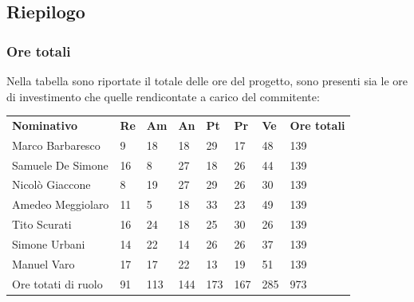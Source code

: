 \subsection{Riepilogo}
    \subsubsection{Ore totali}
        Nella tabella sono riportate il totale delle ore del progetto, sono presenti sia le ore di investimento che quelle rendicontate a carico del commitente:
            \begin{center}
                \begin{table}[ht!]
                    \centering
                    \renewcommand{\arraystretch}{1.8}
                    \begin{tabular}{p{100px} p{20px} p{20px} p{20px} p{20px} p{20px} p{20px} p{50px} }
                        \rowcolor{logo!70} \textbf{Nominativo} & \textbf{Re} & \textbf{Am} & \textbf{An} & \textbf{Pt} & \textbf{Pr} & \textbf{Ve} & \textbf{Ore totali}\\
                        Marco Barbaresco & 9 & 18 & 18 & 29 & 17 & 48 & 139\\
                        Samuele De Simone & 16 & 8 & 27 & 18 & 26 & 44 & 139\\
                        Nicolò Giaccone & 8 & 19 & 27 & 29 & 26 & 30 & 139\\
                        Amedeo Meggiolaro & 11 & 5 & 18 & 33 & 23 & 49 & 139\\
                        Tito Scurati & 16 & 24 & 18 & 25 & 30 & 26 & 139\\
                        Simone Urbani & 14 & 22 & 14 & 26 & 26 & 37 & 139\\
                        Manuel Varo & 17 & 17 & 22 & 13 & 19 & 51 & 139\\
                        Ore totati di ruolo & 91 & 113 & 144 & 173 & 167 & 285 & 973\\
                    \end{tabular}
                \end{table}
            \end{center}
            \pagebreak

